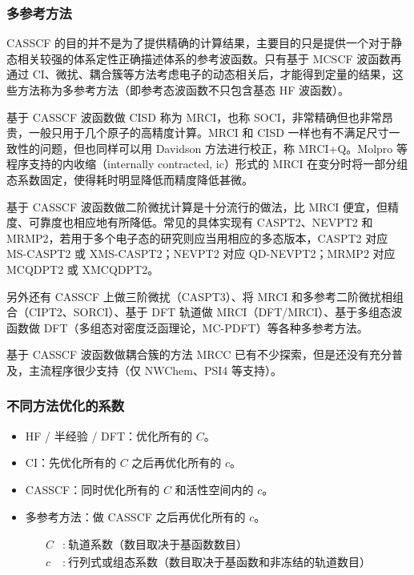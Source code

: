 \subsubsection*{多参考方法}

CASSCF 的目的并不是为了提供精确的计算结果，主要目的只是提供一个对于静态相关较强的体系定性正确描述体系的参考波函数。只有基于 MCSCF 波函数再通过 CI、微扰、耦合簇等方法考虑电子的动态相关后，才能得到定量的结果，这些方法称为多参考方法（即参考态波函数不只包含基态 HF 波函数）。

基于 CASSCF 波函数做 CISD 称为 MRCI，也称 SOCI，非常精确但也非常昂贵，一般只用于几个原子的高精度计算。MRCI 和 CISD 一样也有不满足尺寸一致性的问题，但也同样可以用 Davidson 方法进行校正，称 MRCI+Q。Molpro 等程序支持的内收缩（internally contracted, ic）形式的 MRCI 在变分时将一部分组态系数固定，使得耗时明显降低而精度降低甚微。

基于 CASSCF 波函数做二阶微扰计算是十分流行的做法，比 MRCI 便宜，但精度、可靠度也相应地有所降低。常见的具体实现有 CASPT2、NEVPT2 和 MRMP2，若用于多个电子态的研究则应当用相应的多态版本，CASPT2 对应 MS-CASPT2 或 XMS-CASPT2；NEVPT2 对应 QD-NEVPT2；MRMP2 对应 MCQDPT2 或 XMCQDPT2。

另外还有 CASSCF 上做三阶微扰（CASPT3）、将 MRCI 和多参考二阶微扰相组合（CIPT2、SORCI）、基于 DFT 轨道做 MRCI（DFT/MRCI）、基于多组态波函数做 DFT（多组态对密度泛函理论，MC-PDFT）等各种多参考方法。

基于 CASSCF 波函数做耦合簇的方法 MRCC 已有不少探索，但是还没有充分普及，主流程序很少支持（仅 NWChem、PSI4 等支持）。

\subsubsection*{不同方法优化的系数}

\begin{itemize}
  \item HF / 半经验 / DFT：优化所有的 $C$。
  \item CI：先优化所有的 $C$ 之后再优化所有的 $c$。
  \item CASSCF：同时优化所有的 $C$ 和活性空间内的 $c$。
  \item 多参考方法：做 CASSCF 之后再优化所有的 $c$。
\end{itemize}

\[
\begin{aligned}
C&:\ \text{轨道系数（数目取决于基函数数目）} \\
c&:\ \text{行列式或组态系数（数目取决于基函数和非冻结的轨道数目）}
\end{aligned}
\]

